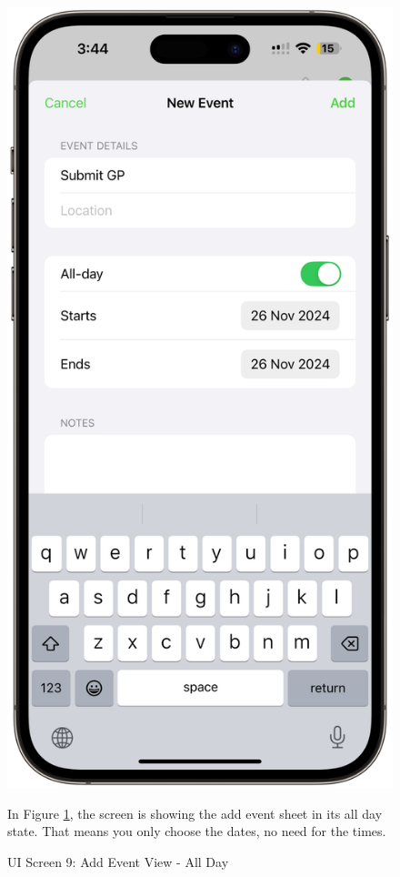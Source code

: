 \begin{figure}[!h]
    \begin{minipage}{0.3\textwidth}
        \centering
        \includegraphics[width=\textwidth]{images/screen9.png}
        \caption{UI Screen 9: Add Event View - All Day}
        \label{fig:ui-screen-9}
    \end{minipage}
    \hfill
    \begin{minipage}{0.65\textwidth}
        In Figure \ref{fig:ui-screen-9}, the screen is showing the add event sheet in its all day state. That means you only choose the dates, no need for the times. 
    \end{minipage}
\end{figure}

